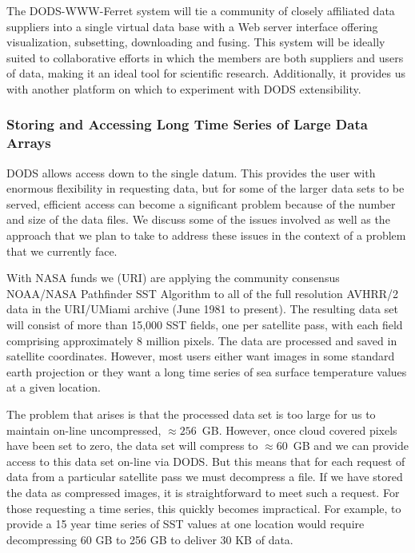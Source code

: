 \documentclass[12pt]{article}
\begin{document}
The \ac{DODS}-\ac{WWW}-Ferret system will tie a community of closely 
affiliated data suppliers into a single virtual data base with a Web 
server interface offering visualization, subsetting, downloading 
and fusing. This system will be ideally suited to collaborative 
efforts in which the members are both suppliers and users of data, 
making it an ideal tool for scientific research. Additionally, it
provides us with another platform on which to experiment with \ac{DODS}
extensibility.

\subsubsection{Storing and Accessing Long Time Series of Large Data 
Arrays}\label{chunking}

\ac{DODS} allows access down to the single datum. This provides the 
user with enormous flexibility in requesting data, but for some of 
the larger data sets to be served, efficient access can become a 
significant problem because of the number and size of the data files. 
We discuss some of the issues involved as well as the approach that 
we plan to take to address these issues in the context of a problem 
that we currently face.

With \acs{NASA} funds we (\ac{URI}) are applying the community 
consensus \ac{NOAA}/\acs{NASA} Pathfinder \ac{SST} Algorithm to 
all of the full resolution \ac{AVHRR}/2 data 
in the \ac{URI}/\ac{UMiami} archive (June 1981 to present).  The 
resulting data set will consist of more than 15,000 \ac{SST} fields, 
one per satellite pass, with each field comprising approximately 8 
million pixels.  The data are processed and saved in satellite 
coordinates.  However, most users either want images in some standard 
earth projection or they want a long time series of sea surface 
temperature values at a given location.

The problem that arises is that the processed data set is too large
for us to maintain on-line uncompressed, $\approx 256$~GB. However,
once cloud covered pixels have been set to zero, the data set will
compress to $\approx 60$~GB and we can provide access to this data
set on-line via \ac{DODS}. But this means that for each request of
data from a particular satellite pass we must decompress a file. If we have
stored the data as compressed images, it is straightforward to meet
such a request.  For those requesting a time series, this quickly 
becomes impractical.  For example, to provide a 15 year time series 
of \ac{SST} values at one location would require decompressing 
60 GB to 256 GB to deliver 30 KB of data.
\end{document}
